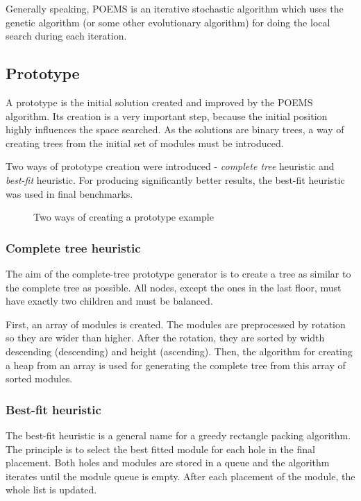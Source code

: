 Generally speaking, POEMS is an iterative stochastic algorithm which uses the genetic algorithm (or some other evolutionary algorithm) for doing the local search during each iteration.

\subsection{Prototype}

A prototype is the initial solution created and improved by the POEMS algorithm. Its creation is a very important step, because the initial position highly influences the space searched. As the solutions are binary trees, a way of creating trees from the initial set of modules must be introduced. 

Two ways of prototype creation were introduced - {\em complete tree} heuristic and {\em best-fit} heuristic. For producing significantly better results, the best-fit heuristic was used in final benchmarks.

\begin{figure}
\centering
{} \hspace{1em}
\caption{Two ways of creating a prototype example}
\label{fig:prototype}
\end{figure}

\subsubsection{Complete tree heuristic}

The aim of the complete-tree prototype generator is to create a tree as similar to the complete tree as possible. All nodes, except the ones in the last floor, must have exactly two children and must be balanced. 

First, an array of modules is created. The modules are preprocessed by rotation so they are wider than higher. After the rotation, they are sorted by width descending (descending) and height (ascending). Then, the algorithm for creating a heap from an array is used for generating the complete tree from this array of sorted modules.

\subsubsection{Best-fit heuristic}

The best-fit heuristic is a general name for a greedy rectangle packing algorithm. The principle is to select the best fitted module for each hole in the final placement. Both holes and modules are stored in a queue and the algorithm iterates until the module queue is empty. After each placement of the module, the whole list is updated.

